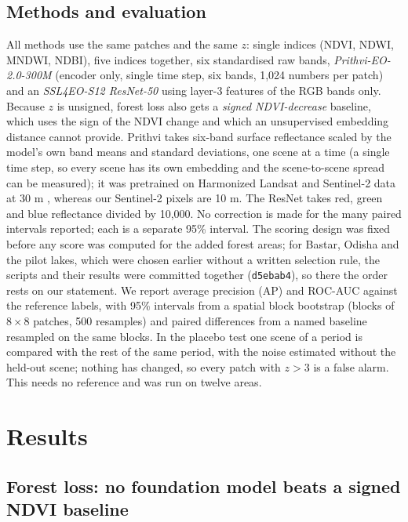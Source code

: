 \documentclass[11pt]{article}
\begin{document}
\subsection{Methods and evaluation}

All methods use the same patches and the same $z$: single indices (NDVI, NDWI, MNDWI, NDBI), five indices together, six standardised raw bands, \textit{Prithvi-EO-2.0-300M} \cite{szwarcman2024} (encoder only, single time step, six bands, 1,024 numbers per patch) and an \textit{SSL4EO-S12 ResNet-50} \cite{wang2022ssl4eo} using layer-3 features of the RGB bands only. Because $z$ is unsigned, forest loss also gets a \textit{signed NDVI-decrease} baseline, which uses the sign of the NDVI change and which an unsupervised embedding distance cannot provide. Prithvi takes six-band surface reflectance scaled by the model's own band means and standard deviations, one scene at a time (a single time step, so every scene has its own embedding and the scene-to-scene spread can be measured); it was pretrained on Harmonized Landsat and Sentinel-2 data at 30 m \cite{szwarcman2024}, whereas our Sentinel-2 pixels are 10 m. The ResNet takes red, green and blue reflectance divided by 10,000. No correction is made for the many paired intervals reported; each is a separate 95\% interval. The scoring design was fixed before any score was computed for the added forest areas; for Bastar, Odisha and the pilot lakes, which were chosen earlier without a written selection rule, the scripts and their results were committed together (\texttt{d5ebab4}), so there the order rests on our statement. We report average precision (AP) and ROC-AUC against the reference labels, with 95\% intervals from a spatial block bootstrap (blocks of $8\times 8$ patches, 500 resamples) and paired differences from a named baseline resampled on the same blocks. In the placebo test one scene of a period is compared with the rest of the same period, with the noise estimated without the held-out scene; nothing has changed, so every patch with $z>3$ is a false alarm. This needs no reference and was run on twelve areas.

\section{Results}

\subsection{Forest loss: no foundation model beats a signed NDVI baseline}
\end{document}
